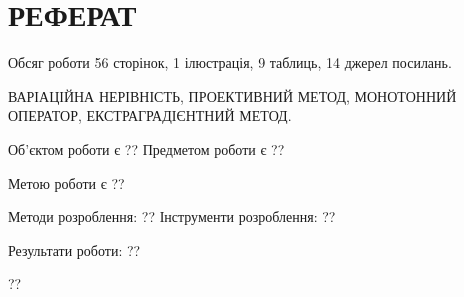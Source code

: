 \chapter*[Реферат]{РЕФЕРАТ}
Обсяг роботи 56 сторінок, 1 ілюстрація, 9 таблиць, 14 джерел посилань. \medskip

\MakeUppercase{Варіаційна нерівність, проективний метод, монотонний оператор, екстраградієнтний метод.} \medskip

Об'єктом роботи є ?? Предметом роботи є ?? \medskip

Метою роботи є ?? \medskip

Методи розроблення: ?? Інструменти розроблення: ?? \medskip

Результати роботи: ??  \medskip

??
